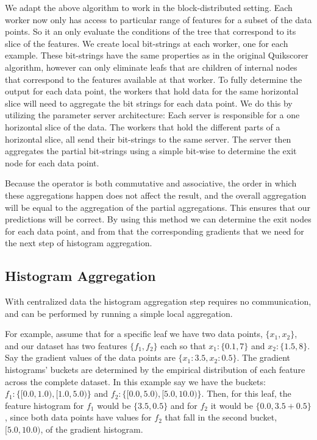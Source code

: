We adapt the above algorithm to work in the block-distributed setting. Each worker
now only has access to particular range of features for a subset of the data points.
So it an only evaluate the conditions of the tree that correspond to its slice
of the features. We create local bit-strings at each worker, one for each example.
These bit-strings have the same properties as in the original Quikscorer algorithm,
however can only eliminate leafs that are children of internal nodes that correspond
to the features available at that worker. To fully determine the output for each
data point, the workers that hold data for the same horizontal slice will need
to aggregate the bit strings for each data point. We do this by utilizing the
parameter server \cite{muPS} architecture: Each server is responsible for a
one horizontal slice of the data. The workers that hold the different parts of
a horizontal slice, all send their bit-strings to the same server.
The server then aggregates the partial bit-strings using a simple bit-wise \AND to determine the exit
node for each data point.

Because the \AND operator is both commutative and associative, the order in which
these aggregations happen does not affect the result, and the overall aggregation
will be equal to the aggregation of the partial aggregations. This ensures that
our predictions will be correct. By using this method we can determine the exit
nodes for each data point, and from that the corresponding gradients that we need
for the next step of histogram aggregation.

\subsection{Histogram Aggregation}

With centralized data the histogram aggregation step requires no communication,
and can be performed by running a simple local aggregation.

For example, assume that for a specific leaf we have two data points, $\{x_1, x_2\}$,
and our dataset has two features $\{f_1, f_2\}$ each so that $x_1: \{0.1, 7\}$ and $x_2: \{1.5, 8\}$.
Say the gradient values of the data points are $\{x_1: 3.5, x_2: 0.5\}$.
The gradient histograms' buckets are determined by the empirical distribution of each
feature across the complete dataset. In this example say we have the buckets:
$f_1: \{[0.0, 1.0), [1.0, 5.0)\}$ and $f_2:\{ [0.0, 5.0), [5.0, 10.0)\}$.
Then, for this leaf, the feature histogram for $f_1$ would be $\{3.5, 0.5\}$ and for $f_2$
it would be $\{0.0, 3.5 + 0.5\}$, since both data points have values for $f_2$ that fall
in the second bucket, $[5.0, 10.0)$, of the gradient histogram.

